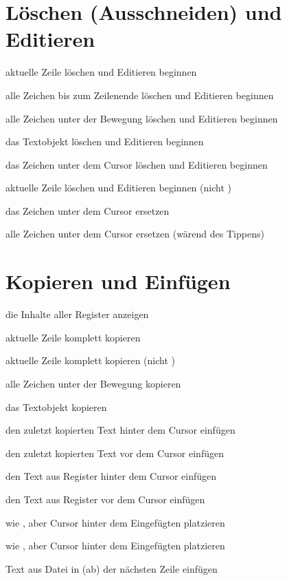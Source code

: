 \documentclass
[
  draft    = true,
  fontsize = 11pt,
  parskip  = half,
  BCOR     = 0pt,
  DIV      = calc,
  ngerman
]
{scrartcl}
\begin{document}
\section{Löschen (Ausschneiden) und Editieren}
\begin{mytemize}
  \item {}  aktuelle Zeile löschen und Editieren beginnen
  \item {}   alle Zeichen bis zum Zeilenende löschen und Editieren beginnen
  \item {}  alle Zeichen unter der Bewegung  löschen und Editieren beginnen
  \item {}  das Textobjekt  löschen und Editieren beginnen
  \item {}   das Zeichen unter dem Cursor löschen und Editieren beginnen
  \item {}   aktuelle Zeile löschen und Editieren beginnen (nicht \vimarg{\$})
  \item {}   das Zeichen unter dem Cursor ersetzen
  \item {}   alle Zeichen unter dem Cursor ersetzen (wärend des Tippens)
\end{mytemize}

\section{Kopieren und Einfügen}
\begin{mytemize}
  \item {} die Inhalte aller Register anzeigen
  \item {}   aktuelle Zeile komplett kopieren
  \item {}    aktuelle Zeile komplett kopieren (nicht \vimarg{\$})
  \item {}   alle Zeichen unter der Bewegung  kopieren
  \item {}   das Textobjekt  kopieren
  \item {}    den zuletzt kopierten Text hinter dem Cursor einfügen
  \item {}    den zuletzt kopierten Text vor dem Cursor einfügen
  \item {}  den Text aus Register  hinter dem Cursor einfügen
  \item {}  den Text aus Register  vor dem Cursor einfügen
  \item {}   wie , aber Cursor hinter dem Eingefügten platzieren
  \item {}   wie , aber Cursor hinter dem Eingefügten platzieren
  \item {}  Text aus Datei  in (ab) der nächsten Zeile einfügen
\end{mytemize}
\end{document}
